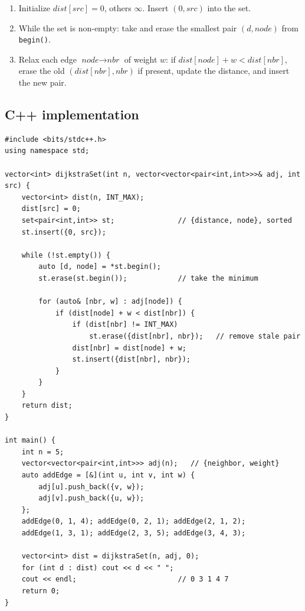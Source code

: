 \begin{enumerate}
  \item Initialize $\textit{dist}[\textit{src}]=0$, others $\infty$.
        Insert $(0,\textit{src})$ into the set.
  \item While the set is non-empty: take and erase the smallest pair
        $(\textit{d},\textit{node})$ from \texttt{begin()}.
  \item Relax each edge $\textit{node}\to\textit{nbr}$ of weight $w$: if
        $\textit{dist}[\textit{node}]+w<\textit{dist}[\textit{nbr}]$,
        erase the old $(\textit{dist}[\textit{nbr}],\textit{nbr})$ if
        present, update the distance, and insert the new pair.
\end{enumerate}

\subsection*{C++ implementation}

\begin{lstlisting}
#include <bits/stdc++.h>
using namespace std;

vector<int> dijkstraSet(int n, vector<vector<pair<int,int>>>& adj, int src) {
    vector<int> dist(n, INT_MAX);
    dist[src] = 0;
    set<pair<int,int>> st;               // {distance, node}, sorted
    st.insert({0, src});

    while (!st.empty()) {
        auto [d, node] = *st.begin();
        st.erase(st.begin());            // take the minimum

        for (auto& [nbr, w] : adj[node]) {
            if (dist[node] + w < dist[nbr]) {
                if (dist[nbr] != INT_MAX)
                    st.erase({dist[nbr], nbr});   // remove stale pair
                dist[nbr] = dist[node] + w;
                st.insert({dist[nbr], nbr});
            }
        }
    }
    return dist;
}

int main() {
    int n = 5;
    vector<vector<pair<int,int>>> adj(n);   // {neighbor, weight}
    auto addEdge = [&](int u, int v, int w) {
        adj[u].push_back({v, w});
        adj[v].push_back({u, w});
    };
    addEdge(0, 1, 4); addEdge(0, 2, 1); addEdge(2, 1, 2);
    addEdge(1, 3, 1); addEdge(2, 3, 5); addEdge(3, 4, 3);

    vector<int> dist = dijkstraSet(n, adj, 0);
    for (int d : dist) cout << d << " ";
    cout << endl;                        // 0 3 1 4 7
    return 0;
}
\end{lstlisting}

